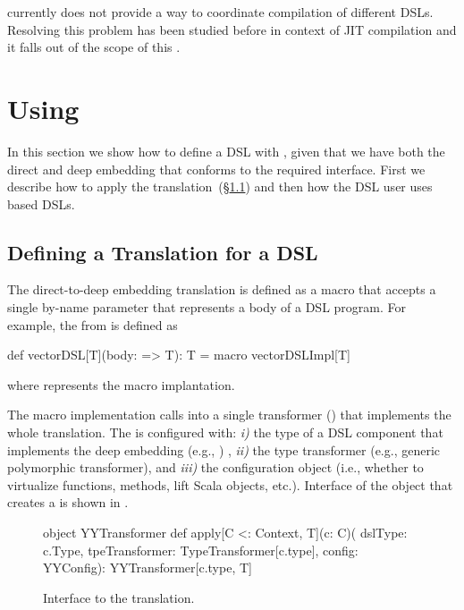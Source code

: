\yy currently does not provide a way to coordinate compilation of different DSLs. Resolving this
 problem has been studied before in context of JIT compilation  and
 it falls out of the scope of this \work.

\section{Using \yy}
\label{sec:using-yy}

In this section we show how to define a DSL with \yy, given that we have
 both the direct and deep embedding that conforms to the required interface.
 First we describe how to apply the translation~(\S \ref{sec:defining-a-translation}) and
 then how the DSL user uses \yy based DSLs.

\subsection{Defining a Translation for a DSL}
\label{sec:defining-a-translation}

The direct-to-deep embedding translation is defined as a macro that accepts a single by-name parameter that represents
a body of a DSL program. For example, the  from  is defined as\begin{lstparagraph}
def vectorDSL[T](body: => T): T = macro vectorDSLImpl[T]
\end{lstparagraph}

where  represents the macro implantation.

The macro implementation calls into a single transformer () that
implements the whole translation. The  is configured with: \emph{i)} the type of
a DSL component that implements the deep embedding (e.g., )
, \emph{ii)} the type transformer (e.g., generic polymorphic transformer), and
\emph{iii)} the configuration object (i.e., whether to virtualize functions, methods, lift Scala objects, etc.).
Interface of the object that creates a  is shown in .
\begin{figure}
\begin{lstparagraph}
object YYTransformer {
  def apply[C <: Context, T](c: C)(
    dslType: c.Type,
    tpeTransformer: TypeTransformer[c.type],
    config: YYConfig): YYTransformer[c.type, T]
}
\end{lstparagraph}
\caption{Interface to the \yy translation.}
\label{fig:YYTransformer}
\end{figure}

